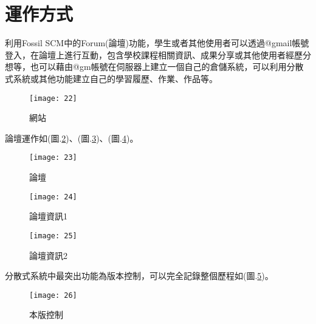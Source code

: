 \renewcommand{\baselinestretch}{20} %
\section{運作方式}
\par
\renewcommand{\baselinestretch}{1} %
\twelve 利用Fossil SCM中的Forum(論壇)功能，學生或者其他使用者可以透過@gmail帳號登入，在論壇上進行互動，包含學校課程相關資訊、成果分享或其他使用者經歷分想等，也可以藉由@gm帳號在伺服器上建立一個自己的倉儲系統，可以利用分散式系統或其他功能建立自己的學習履歷、作業、作品等。
\\
\par
\begin{figure}[hbt!]
\begin{center}
\texttt{[image: 22]}
\caption{\large 網站}\label{fig.網站}
\end{center}
\end{figure}
\par
\twelve 論壇運作如(圖.\ref{fig.論壇})、(圖.\ref{fig.論壇資訊1})、(圖.\ref{fig.論壇資訊2})。
\\
\par
\begin{figure}[hbt!]
\begin{center}
\texttt{[image: 23]}
\caption{\large 論壇}\label{fig.論壇}
\end{center}
\end{figure}
\par
\begin{figure}[hbt!]
\begin{center}
\texttt{[image: 24]}
\caption{\large 論壇資訊1}\label{fig.論壇資訊1}
\end{center}
\end{figure}
\par
\begin{figure}[hbt!]
\begin{center}
\texttt{[image: 25]}
\caption{\large 論壇資訊2}\label{fig.論壇資訊2}
\end{center}
\end{figure}
\par
\twelve 分散式系統中最突出功能為版本控制，可以完全記錄整個歷程如(圖.\ref{fig.本版控制})。
\\
\par
\begin{figure}[hbt!]
\begin{center}
\texttt{[image: 26]}
\caption{\large 本版控制}\label{fig.本版控制}
\end{center}
\end{figure}
